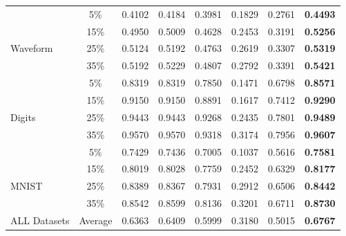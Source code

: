 \documentclass[conference]{IEEEtran}
\begin{document}
\begin{table}[h]
\begin{tabular}{lccccccc}
           & 5\%   & 0.4102  & 0.4184 & 0.3981      &0.1829    &0.2761  & \textbf{0.4493}   \\
           & 15\%  & 0.4950  & 0.5009 & 0.4628      &0.2453    &0.3191  & \textbf{0.5256}  \\ 
Waveform   & 25\%  & 0.5124  & 0.5192 & 0.4763      &0.2619    &0.3307  & \textbf{0.5319} \\ 
           & 35\%  & 0.5192  & 0.5229 & 0.4807      &0.2792    &0.3391  & \textbf{0.5421} \\ 
          
           & 5\%   & 0.8319  & 0.8319 & 0.7850      &0.1471    &0.6798  & \textbf{0.8571}   \\
           & 15\%  & 0.9150  & 0.9150 & 0.8891      &0.1617    &0.7412  & \textbf{0.9290} \\ 
Digits     & 25\%  & 0.9443  & 0.9443 & 0.9268      &0.2435    &0.7801  & \textbf{0.9489} \\ 
           & 35\%  & 0.9570  & 0.9570 & 0.9318      &0.3174    &0.7956  & \textbf{0.9607} \\ 

           & 5\%  & 0.7429 & 0.7436 & 0.7005        &0.1037    &0.5616  & \textbf{0.7581}\\
           & 15\% & 0.8019 & 0.8028 & 0.7759        &0.2452    &0.6329  & \textbf{0.8177} \\
MNIST      & 25\% & 0.8389 & 0.8367 & 0.7931        &0.2912    &0.6506  & \textbf{0.8442}  \\
           & 35\% & 0.8542 & 0.8599 & 0.8136        &0.3201    &0.6711  & \textbf{0.8730}\\
        \toprule 
ALL Datasets & Average  & 0.6363  & 0.6409 & 0.5999 &0.3180    &0.5015      & \textbf{0.6767} \\ \toprule 
\end{tabular}
\label{NMI}
\vspace{-5mm}
\end{table} 
\end{document}
